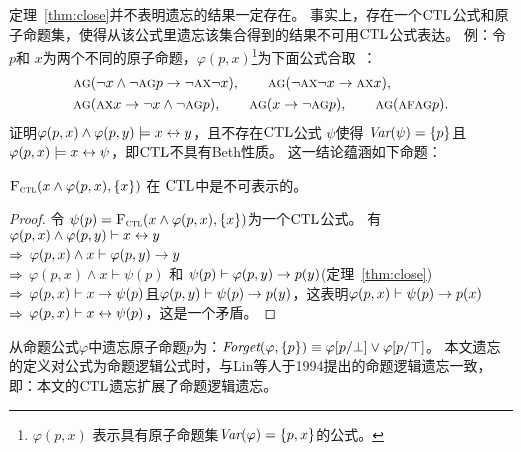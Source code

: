 定理~\ref{thm:close}并不表明遗忘的结果一定存在。
事实上，存在一个$\textrm{CTL}$公式和原子命题集，使得从该公式里遗忘该集合得到的结果不可用$\textrm{CTL}$公式表达。
例：令$p$和 $x$为两个不同的原子命题，$\varphi(p,x)$\footnote{$\varphi(p,x)$ 表示具有原子命题集$\textit{Var}(\varphi)=\{p,x\}$的公式。}为下面公式合取~\cite{Maksimova:JANCL:1991}：
\begin{align*}
	&\textsc{a}\textsc{g}(\neg x \wedge \neg \textsc{a} \textsc{g} p \rightarrow \neg \textsc{a} \textsc{x} \neg x),
	\qquad \textsc{a}\textsc{g}(\neg \textsc{a}\textsc{x} \neg x \rightarrow \textsc{a} \textsc{x} x),\\
	& \textsc{a}\textsc{g}(\textsc{a}\textsc{x} x \rightarrow \neg x \wedge \neg \textsc{a} \textsc{g} p),
	\qquad \textsc{a}\textsc{g}(x \rightarrow \neg \textsc{a}\textsc{g} p),
	\qquad \textsc{a}\textsc{g}(\textsc{a} \textsc{f} \textsc{a} \textsc{g} p).
\end{align*}
\citeauthor{Maksimova:JANCL:1991}证明$\varphi(p,x)\land \varphi(p,y)\models x\leftrightarrow y$，且不存在$\textrm{CTL}$公式 $\psi$使得 $\textit{Var}(\psi)=\{p\}$且$\varphi(p,x)\models x\leftrightarrow \psi$，即$\textrm{CTL}$不具有Beth性质。
这一结论蕴涵如下命题：
\begin{proposition}\label{pro:uniforget}
	${\textsc{F}_{\textsc{ctl}}}(x\land \varphi(p,x), \{x\})$ 在 $\textrm{CTL}$中是不可表示的。
\end{proposition}
\begin{proof}
	令 $\psi(p)={\textsc{F}_{\textsc{ctl}}}(x\land \varphi(p,x), \{x\})$为一个$\textrm{CTL}$公式。
	有 \\
	$\varphi(p,x)\land \varphi(p,y)\vdash x\leftrightarrow y$\\
	$\Rightarrow$ $\varphi(p,x)\land x \vdash \varphi(p,y)\rightarrow y$\\
	$\Rightarrow$ $\varphi(p,x)\land x\vdash \psi(p)$ 和 $\psi(p)\vdash \varphi(p,y)\rightarrow p(y)$\hfill (定理~\ref{thm:close})\\
	$\Rightarrow$ $\varphi(p,x)\vdash x\rightarrow\psi(p)$且$\varphi(p,y)\vdash \psi(p)\rightarrow p(y)$，这表明$\varphi(p,x)\vdash \psi(p)\rightarrow p(x)$\\
	$\Rightarrow$ $\varphi(p,x)\vdash x\leftrightarrow \psi(p)$，这是一个矛盾。
\end{proof}




从命题公式$\varphi$中遗忘原子命题$p$为：$\textit{Forget}(\varphi,\{p\})\equiv\varphi[p/\bot] \vee \varphi[p/\top]$。
本文遗忘的定义对公式为命题逻辑公式时，与Lin等人于1994提出的命题逻辑遗忘一致，即：本文的$\textrm{CTL}$遗忘扩展了命题逻辑遗忘。%

